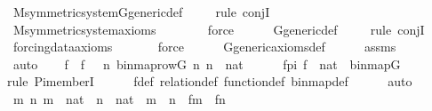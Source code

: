 \begin{isabellebody}
\ M{\isacharunderscore}{\kern0pt}symmetric{\isacharunderscore}{\kern0pt}system{\isacharunderscore}{\kern0pt}G{\isacharunderscore}{\kern0pt}generic{\isacharunderscore}{\kern0pt}def\isanewline
\ \ \ \ \isamarkupfalse%
{\isacharparenleft}{\kern0pt}rule\ conjI{\isacharparenright}{\kern0pt}\isanewline
\ \ \ \ \isamarkupfalse%
\ M{\isacharunderscore}{\kern0pt}symmetric{\isacharunderscore}{\kern0pt}system{\isacharunderscore}{\kern0pt}axioms\ \isanewline
\ \ \ \ \ \isamarkupfalse%
\ force\isanewline
\ \ \ \ \isamarkupfalse%
\ G{\isacharunderscore}{\kern0pt}generic{\isacharunderscore}{\kern0pt}def\isanewline
\ \ \ \ \isamarkupfalse%
{\isacharparenleft}{\kern0pt}rule\ conjI{\isacharparenright}{\kern0pt}\isanewline
\ \ \ \ \isamarkupfalse%
\ forcing{\isacharunderscore}{\kern0pt}data{\isacharunderscore}{\kern0pt}axioms\isanewline
\ \ \ \ \ \isamarkupfalse%
\ force\isanewline
\ \ \ \ \isamarkupfalse%
\ G{\isacharunderscore}{\kern0pt}generic{\isacharunderscore}{\kern0pt}axioms{\isacharunderscore}{\kern0pt}def\isanewline
\ \ \ \ \isamarkupfalse%
\ assms\isanewline
\ \ \ \ \isamarkupfalse%
\ auto\isanewline
\isanewline
\isanewline
\ \ \isamarkupfalse%
\ f\ \ {\isachardoublequoteopen}f\ {\isasymequiv}\ {\isacharbraceleft}{\kern0pt}\ {\isacharless}{\kern0pt}n{\isacharcomma}{\kern0pt}\ binmap{\isacharunderscore}{\kern0pt}row{\isacharparenleft}{\kern0pt}G{\isacharcomma}{\kern0pt}\ n{\isacharparenright}{\kern0pt}{\isachargreater}{\kern0pt}{\isachardot}{\kern0pt}\ n\ {\isasymin}\ nat\ {\isacharbraceright}{\kern0pt}{\isachardoublequoteclose}\ \isanewline
\ \ \isamarkupfalse%
\ fpi{\isacharcolon}{\kern0pt}\ {\isachardoublequoteopen}f\ {\isasymin}\ nat\ {\isasymrightarrow}\ binmap{\isacharparenleft}{\kern0pt}G{\isacharparenright}{\kern0pt}{\isachardoublequoteclose}\ \isanewline
\ \ \ \ \isamarkupfalse%
{\isacharparenleft}{\kern0pt}rule\ Pi{\isacharunderscore}{\kern0pt}memberI{\isacharparenright}{\kern0pt}\isanewline
\ \ \ \ \isamarkupfalse%
\ f{\isacharunderscore}{\kern0pt}def\ relation{\isacharunderscore}{\kern0pt}def\ function{\isacharunderscore}{\kern0pt}def\ binmap{\isacharunderscore}{\kern0pt}def\isanewline
\ \ \ \ \isamarkupfalse%
\ auto\isanewline
\ \ \isamarkupfalse%
\ {\isachardoublequoteopen}{\isasymAnd}m\ n{\isachardot}{\kern0pt}\ m\ {\isasymin}\ nat\ {\isasymLongrightarrow}\ n\ {\isasymin}\ nat\ {\isasymLongrightarrow}\ m\ {\isasymnoteq}\ n\ {\isasymLongrightarrow}\ f{\isacharbackquote}{\kern0pt}m\ {\isasymnoteq}\ f{\isacharbackquote}{\kern0pt}n{\isachardoublequoteclose}\ \isanewline

\end{isabellebody}
